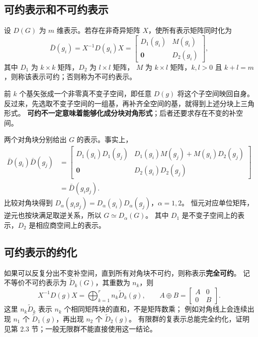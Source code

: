 \subsection{可约表示和不可约表示}
\begin{definition}[可约表示]
设 $D\left(G\right)$ 为 $m$ 维表示。若存在非奇异矩阵 $X$，使所有表示矩阵同时化为
\begin{equation}
\bar D\left(g_i\right)=X^{-1}D\left(g_i\right)X
=\begin{bmatrix}D_1\left(g_i\right)&M\left(g_i\right)\\\bm{0}&D_2\left(g_i\right)\end{bmatrix},
\end{equation}
其中 $D_1$ 为 $k\times k$ 矩阵，$D_2$ 为 $l\times l$ 矩阵，
$M$ 为 $k\times l$ 矩阵，$k,l>0$ 且 $k+l=m$，则称该表示可约；否则称为不可约表示。
\end{definition}
前 $k$ 个基矢张成一个非零真不变子空间，即任意 $D\left(g\right)$ 将这个子空间映回自身。
反过来，先选取不变子空间的一组基，再补齐全空间的基，就得到上述分块上三角形式。
\textbf{可约不一定意味着能够化成分块对角形式}；后者还要求存在不变的补空间。

两个对角块分别给出 $G$ 的表示。事实上，
\begin{align}
\bar D\left(g_i\right)\bar D\left(g_j\right)
&=\begin{bmatrix}
D_1\left(g_i\right)D_1\left(g_j\right)&D_1\left(g_i\right)M\left(g_j\right)+M\left(g_i\right)D_2\left(g_j\right)\\
\bm{0}&D_2\left(g_i\right)D_2\left(g_j\right)
\end{bmatrix}\\
&=\bar D\left(g_ig_j\right).
\end{align}
比较对角块得到 $D_\alpha\left(g_ig_j\right)=D_\alpha\left(g_i\right)D_\alpha\left(g_j\right)$，$\alpha=1,2$。
恒元对应单位矩阵，逆元也按块满足取逆关系，所以 $G\simeq D_\alpha\left(G\right)$。
其中 $D_1$ 是不变子空间上的表示，$D_2$ 是相应商空间上的表示。

\subsection{可约表示的约化}
如果可以反复分出不变补空间，直到所有对角块不可约，则称表示\textbf{完全可约}。
记不等价不可约表示为 $\tilde D_k\left(G\right)$，其重数为 $n_k$，则
\begin{equation}
X^{-1}D\left(g\right)X=\bigoplus_{k=1}^{r}n_k\tilde D_k\left(g\right),\qquad
A\oplus B=\begin{bmatrix}A&0\\0&B\end{bmatrix}.
\end{equation}
这里 $n_k\tilde D_k$ 表示 $n_k$ 个相同矩阵块的直和，不是矩阵数乘；
例如对角线上会连续出现 $n_1$ 个 $\tilde D_1\left(g\right)$，再出现 $n_2$ 个 $\tilde D_2\left(g\right)$。
有限群的复表示总能完全约化，证明见第 2.3 节；一般无限群不能直接使用这一结论。

